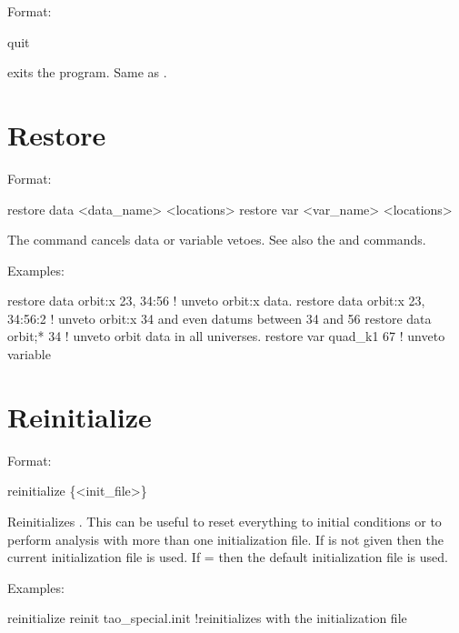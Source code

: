 Format:
\begin{example}
  quit
\end{example}

\vskip 0.2in
 exits the program. Same as .

\section{Restore}
\label{s:restore}

Format:
\begin{example}
  restore data  <data_name> <locations>
  restore var <var_name> <locations>
\end{example}

\vskip 0.2in 
The  command cancels data or variable
vetoes. See also the 
and  commands.

Examples:
\begin{example}
  restore data orbit:x  23, 34:56   ! unveto orbit:x data.
  restore data orbit:x  23, 34:56:2 ! unveto orbit:x 34 and even datums between
34 and 56
  restore data orbit;* 34           ! unveto orbit data in all universes.
  restore var quad_k1 67            ! unveto variable
\end{example}

\section{Reinitialize}
\label{s:reinit}

Format:
\begin{example}
  reinitialize \{<init_file>\}
\end{example}

\vskip 0.2in Reinitializes \tao. This can be useful to reset everything to
initial conditions or to perform analysis with more than one initialization file.
If  is not given then 
the current initialization file is used. If  =  then
the default initialization file  is used.

Examples:
\begin{example}
  reinitialize 
  reinit tao_special.init !reinitializes \tao with the initialization file 
\end{example}


